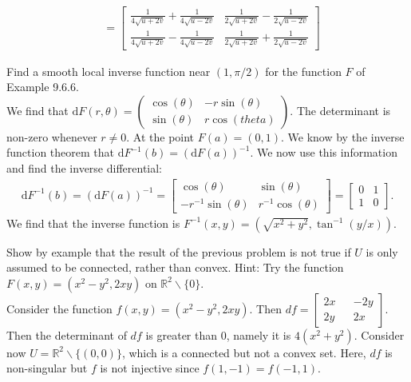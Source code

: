 \documentclass[12pt]{book}
\newcommand{\R}{\mathbb{R}}
\newenvironment{exercise}[2][Exercise]{\begin{trivlist}
\item[\hskip \labelsep {\bfseries #1}\hskip \labelsep {\bfseries #2.}]}{\end{trivlist}}
\begin{document}
\begin{exercise}{7.2.7}
\begin{exercise}{9.6.2}
\begin{align*}
                            &= \left[\begin{matrix}\frac{1}{4 \sqrt{u + 2 v}} + \frac{1}{4 \sqrt{u - 2 v}} & \frac{1}{2 \sqrt{u + 2 v}} - \frac{1}{2 \sqrt{u - 2 v}}\\\frac{1}{4 \sqrt{u + 2 v}} - \frac{1}{4 \sqrt{u - 2 v}} & \frac{1}{2 \sqrt{u + 2 v}} + \frac{1}{2 \sqrt{u - 2 v}}\end{matrix}\right]
    \end{align*}
\end{exercise}




\begin{exercise}{9.6.5}
    Find a smooth local inverse function near $(1, \pi/2)$ for the function $F$ of Example 9.6.6.  \\

We find that $\text{d} F(r, \theta)= \begin{pmatrix} \cos(\theta) & -r \sin(\theta) \\ \sin(\theta) & r \cos(theta) \end{pmatrix}$. The determinant is non-zero whenever $r\neq 0$. At the point $F(a)=(0,1)$. We know by the inverse function theorem that $\text{d} F^{-1} (b) = \left( \text{d} F(a) \right)^{-1}$. We now use this information and find the inverse differential:
    \begin{align*}
    \text{d} F^{-1}(b) = \left( \text{d} F(a)\right)^{-1} = \begin{bmatrix} \cos(\theta) & \sin(\theta) \\ -r^{-1} \sin(\theta) & r^{-1} \cos(\theta) \end{bmatrix} = \begin{bmatrix} 0 & 1 \\ 1 & 0 \end{bmatrix}.
    \end{align*}
    We find that the inverse function is $F^{-1}(x,y) = \left( \sqrt{x^2 + y^2}, \tan^{-1}(y/x)\right)$.
\end{exercise}





\begin{exercise}{9.6.8}
    Show by example that the result of the previous problem is not true if $U$ is only assumed to be connected, rather than convex. Hint: Try the function $F(x,y) = (x^2 - y^2, 2 x y)$ on $\R^2 \backslash \{0\}$.  \\

    Consider the function $f(x,y) = (x^2-y^2, 2xy) $. Then $df = \begin{bmatrix} 2x && -2y\\ 2y && 2x \end{bmatrix} $. Then the determinant of $df$ is greater than 0, namely it is $4(x^2+y^2)$. Consider now $U=\R^2 \backslash \{(0,0)\}$, which is a connected but not a convex set. Here, $df$ is non-singular but $f$ is not injective since $f(1,-1)=f(-1,1)$.
\end{exercise}






\end{exercise}
\end{document}

